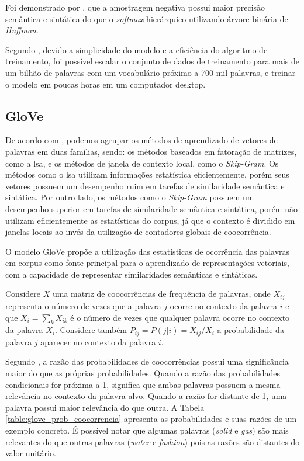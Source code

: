 Foi demonstrado por \textcite{Mikolov2013DistributedRepresentations}, que a amostragem negativa possui maior precisão semântica e sintática do que o \textit{softmax} hierárquico utilizando árvore binária de \textit{Huffman}. 

Segundo \textcite{Gouws2016TrainingNeuralWE}, devido a simplicidade do modelo e a eficiência do algoritmo de treinamento, foi possível escalar o conjunto de dados de treinamento para mais de um bilhão de palavras com um vocabulário próximo a 700 mil palavras, e treinar o modelo em poucas horas em um computador desktop.

\subsection{GloVe}
\label{sec:word-embedding-glove}

De acordo com \textcite{Pennington2014GloveGV}, podemos agrupar os métodos de aprendizado de vetores de palavras em duas famílias, sendo: os métodos baseados em fatoração de matrizes, como a \gls{lsa}, e os métodos de janela de contexto local, como o \textit{Skip-Gram}. Os métodos como o \gls{lsa} utilizam informações estatística eficientemente, porém seus vetores possuem um desempenho ruim em tarefas de similaridade semântica e sintática. Por outro lado, os métodos como o \textit{Skip-Gram} possuem um desempenho superior em tarefas de similaridade semântica e sintática, porém não utilizam eficientemente as estatísticas do corpus, já que o contexto é dividido em janelas locais ao invés da utilização de contadores globais de coocorrência.

O modelo GloVe propõe a utilização das estatísticas de ocorrência das palavras em corpus como fonte principal para o aprendizado de representações vetoriais, com a capacidade de representar similaridades semânticas e sintáticas. 

Considere $X$ uma matriz de coocorrências de frequência de palavras, onde $X_{ij}$ representa o número de vezes que a palavra $j$ ocorre no contexto da palavra $i$ e que $X_i = \sum_k X_{ik}$ é o número de vezes que qualquer palavra ocorre no contexto da palavra $X_i$. Considere também $P_{ij} = P(j|i) = X_{ij}/X_i$ a probabilidade da palavra $j$ aparecer no contexto da palavra $i$.

Segundo \textcite{Pennington2014GloveGV}, a razão das probabilidades de coocorrências possui uma significância maior do que as próprias probabilidades. Quando a razão das probabilidades condicionais for próxima a 1, significa que ambas palavras possuem a mesma relevância no contexto da palavra alvo. Quando a razão for distante de 1, uma palavra possui maior relevância do que outra. A Tabela \ref{table:glove_prob_coocorrencia} apresenta as probabilidades e suas razões de um exemplo concreto. É possível notar que algumas palavras (\textit{solid} e \textit{gas}) são mais relevantes do que outras palavras (\textit{water} e \textit{fashion}) pois as razões são distantes do valor unitário. 

